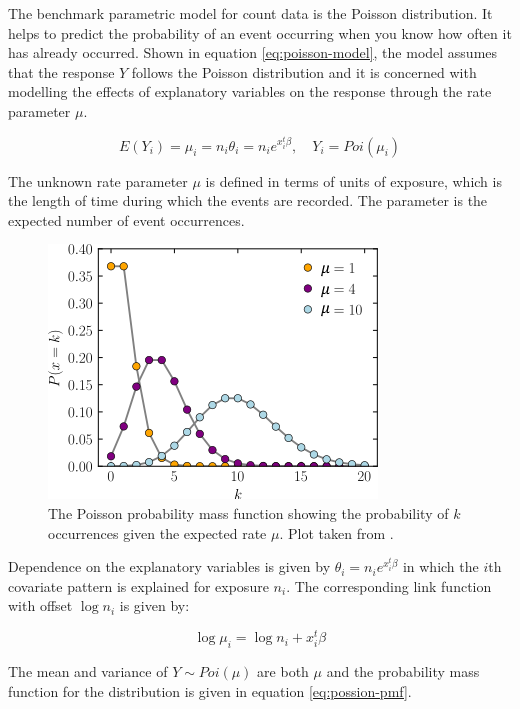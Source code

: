 \documentclass{thesis}
\begin{document}
The benchmark parametric model for count data is the Poisson distribution\cite{cameron_trivedi_2013}. It helps to predict the probability of an event occurring when you know how often it has already occurred. Shown in equation \ref{eq:poisson-model}, the model assumes that the response $Y$ follows the Poisson distribution and it is concerned with modelling the effects of explanatory variables on the response through the rate parameter $\mu$. 

\begin{equation}
    E(Y_i) = \mu_i = n_i\theta_i = n_ie^{x_i^t\beta},\hspace{1em}Y_i = Poi(\mu_i)
    \label{eq:poisson-model}
\end{equation}

The unknown rate parameter $\mu$ is defined in terms of units of exposure, which is the length of time during which the events are recorded\cite{cameron_trivedi_2013}. The parameter is the expected number of event occurrences.

\begin{figure}[h]
    \centering
    \includegraphics[scale=0.8]{images/poisson-pmf.png}
    \caption{The Poisson probability mass function showing the probability of $k$ occurrences given the expected rate $\mu$. Plot taken from \cite{poisson-wikipedia}.}
    \label{fig:poisson-pmf}
\end{figure}

Dependence on the explanatory variables is given by $\theta_i = n_ie^{x_i^t\beta}$ in which the $i$th covariate pattern is explained for exposure $n_i$. The corresponding link function with offset $\log{n_i}$ is given by:

\begin{equation}
    \log{\mu_i} = \log{n_i} + x_i^t\beta
\end{equation}

The mean and variance of $Y \sim Poi(\mu)$ are both $\mu$ and the probability mass function for the distribution is given in equation \ref{eq:possion-pmf}. 
\end{document}
